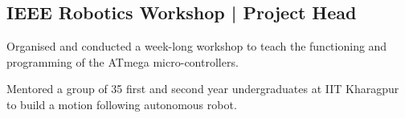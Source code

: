 \documentclass[]{cvclass}
\begin{document}
\begin{minipage}[t]{0.45\textwidth}
\separation

\subsection{IEEE Robotics Workshop | Project Head}
\separation
\begin{smallBullet}
\item Organised and conducted a week-long workshop to teach the functioning and programming of the ATmega micro-controllers.
\item Mentored a group of 35 first and second year undergraduates at IIT Kharagpur to build a motion following autonomous robot.
\end{smallBullet}

\end{minipage}
\hfill
\end{document}
